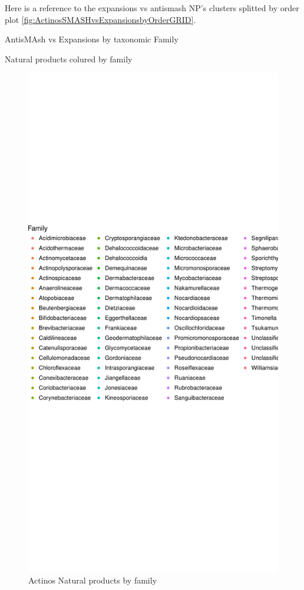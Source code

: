 \documentclass[12pt,twoside]{reedthesis}
\begin{document}
  Here is a reference to the expansions vs antismash NP's clusters
  splitted by order plot
  \autoref{fig:ActinosSMASHvsExpansionsbyOrderGRID}. \clearpage 
  
  AntisMAsh vs Expansions by taxonomic Family
  
  Natural products colured by family
  
  \begin{figure}[h!tbp]
  \centering
  \includegraphics[angle = 0,scale = 0.6]{chapter4/Actinosnpf.pdf}
  \caption[Actinos Natural products by family]{\normalsize{Actinos Natural products by family}}
  \label{fig:Actinosnpf}
  \end{figure}
  
\end{document}
